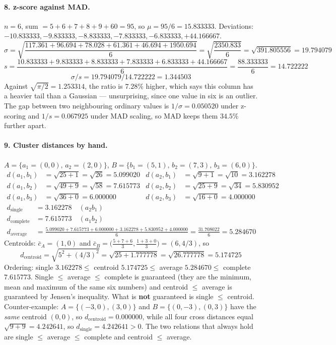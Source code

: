 \documentclass[11pt]{article}
\begin{document}
\paragraph{8. z-score against MAD.}
$n = 6$, sum $= 5+6+7+8+9+60 = 95$, so $\mu = 95/6 = 15.833333$.
Deviations: $-10.833333, -9.833333, -8.833333, -7.833333, -6.833333,
+44.166667$.
\[
  \sigma = \sqrt{\frac{117.361 + 96.694 + 78.028 + 61.361 + 46.694
    + 1950.694}{6}} = \sqrt{\frac{2350.833}{6}} = \sqrt{391.805556}
    = 19.794079
\]
\[
  s = \frac{10.833333+9.833333+8.833333+7.833333+6.833333+44.166667}{6}
    = \frac{88.333333}{6} = 14.722222
\]
\[
  \sigma / s = 19.794079 / 14.722222 = 1.344503
\]
Against $\sqrt{\pi/2} = 1.253314$, the ratio is $7.28\%$ higher, which says
this column has a heavier tail than a Gaussian --- unsurprising, since one
value in six is an outlier. The gap between two neighbouring ordinary values
is $1/\sigma = 0.050520$ under z-scoring and $1/s = 0.067925$ under MAD
scaling, so MAD keeps them $34.5\%$ further apart.

\paragraph{9. Cluster distances by hand.}
$A = \{a_1 = (0,0),\, a_2 = (2,0)\}$, $B = \{b_1 = (5,1),\, b_2 = (7,3),\,
b_3 = (6,0)\}$.
\begin{align*}
  d(a_1,b_1) &= \sqrt{25+1} = \sqrt{26} = 5.099020 &
  d(a_2,b_1) &= \sqrt{9+1} = \sqrt{10} = 3.162278 \\
  d(a_1,b_2) &= \sqrt{49+9} = \sqrt{58} = 7.615773 &
  d(a_2,b_2) &= \sqrt{25+9} = \sqrt{34} = 5.830952 \\
  d(a_1,b_3) &= \sqrt{36+0} = 6.000000 &
  d(a_2,b_3) &= \sqrt{16+0} = 4.000000
\end{align*}
\begin{align*}
  d_{\text{single}} &= 3.162278 \quad (a_2 b_1) \\
  d_{\text{complete}} &= 7.615773 \quad (a_1 b_2) \\
  d_{\text{average}} &= \frac{5.099020 + 7.615773 + 6.000000
    + 3.162278 + 5.830952 + 4.000000}{6} = \frac{31.708022}{6} = 5.284670
\end{align*}
Centroids: $\bar{c}_A = (1, 0)$ and
$\bar{c}_B = \big(\frac{5+7+6}{3}, \frac{1+3+0}{3}\big) = (6, 4/3)$, so
\[
  d_{\text{centroid}} = \sqrt{5^2 + (4/3)^2} = \sqrt{25 + 1.777778}
    = \sqrt{26.777778} = 5.174725
\]
Ordering: single $3.162278 \le$ centroid $5.174725 \le$ average $5.284670
\le$ complete $7.615773$. Single $\le$ average $\le$ complete is guaranteed
(they are the minimum, mean and maximum of the same six numbers) and
centroid $\le$ average is guaranteed by Jensen's inequality. What is
\textbf{not} guaranteed is single $\le$ centroid. Counter-example:
$A = \{(-3,0),(3,0)\}$ and $B = \{(0,-3),(0,3)\}$ have the \emph{same}
centroid $(0,0)$, so $d_{\text{centroid}} = 0.000000$, while all four cross
distances equal $\sqrt{9+9} = 4.242641$, so
$d_{\text{single}} = 4.242641 > 0$. The two relations that always hold are
single $\le$ average $\le$ complete and centroid $\le$ average.
\end{document}
